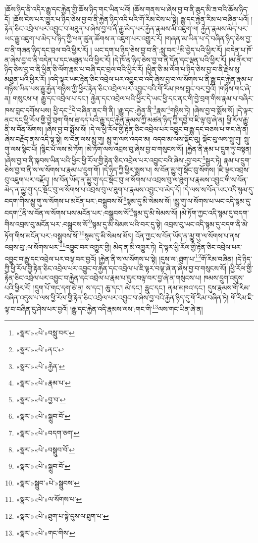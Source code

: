 །ཆོས་ཉིད་ནི་འདིར་རྒྱུ་དང་རྐྱེན་གྱི་ཆོས་ཉིད་གང་ཡིན་པའོ། །ཆོས་གནས་པ་ཞེས་བྱ་བ་ནི་ཆུད་མི་ཟ་བའི་ཆོས་ཉིད་དོ། །ཆོས་ངེས་པར་གྱུར་པ་ཉིད་ཅེས་བྱ་བ་ནི་རྐྱེན་ཉིད་འདི་པའི་གོ་རིམ་ངེས་པ་སྟེ། རྒྱུ་དང་རྐྱེན་རིམ་པ་བཞིན་པའོ། །རྟེན་ཅིང་འབྲེལ་པར་འབྱུང་བ་མཐུན་པ་ཞེས་བྱ་བ་ནི་རྒྱུ་མེད་པར་རྐྱེན་རྣམས་མི་འཇུག་ལ། རྐྱེན་རྣམས་མེད་པར་ཡང་རྒྱུ་འཇུག་པ་མེད་པ་ཉིད་ཀྱི་ཕན་ཚུན་ཚོགས་ན་འཇུག་པར་འགྱུར་རོ། །གཞན་མ་ཡིན་པ་དེ་བཞིན་ཉིད་ཅེས་བྱ་བ་ནི་གཞན་ཉིད་དང་བྲལ་བའི་ཕྱིར་རོ། །
ཡང་དག་པ་ཉིད་ཅེས་བྱ་བ་ནི་:སླུ་བར་\footnote{«སྣར་»«པེ་»བསླུ་བར་}མི་བྱེད་པའི་ཕྱིར་རོ། །བདེན་པ་ཁོ་ན་ཞེས་བྱ་བ་ནི་བདེན་པ་དང་མཐུན་པའི་ཕྱིར་རོ། །དེ་ཁོ་ན་ཉིད་ཅེས་བྱ་བ་ནི་དོན་དང་ལྡན་པའི་ཕྱིར་རོ། །མ་ནོར་བ་ཉིད་ཅེས་བྱ་བ་ནི་ཕྱིན་ཅི་ལོག་རྣམ་པ་བཞི་དང་བྲལ་བའི་ཕྱིར་རོ། །ཕྱིན་ཅི་མ་ལོག་པ་ཉིད་ཅེས་བྱ་བ་ནི་རྗེས་སུ་མཐུན་པའི་ཕྱིར་རོ། །འདི་ལྟར་ཡང་རྟེན་ཅིང་འབྲེལ་པར་འབྱུང་བ་འདི་ཞེས་བྱ་བ་ལ་སོགས་པ་ནི་རྒྱུ་དང་རྐྱེན་རྣམ་པ་གཉིས་ཡིན་པས་རྒྱུ་རྐྱེན་གཉིས་ཀྱི་ཕྱིར་རྟེན་ཅིང་འབྲེལ་པར་འབྱུང་བའི་གོ་རིམ་ཁས་བླང་བར་བྱའོ། །གཉིས་གང་ཞེ་ན། གསུངས་པ། རྒྱུ་དང་འབྲེལ་པ་དང་། རྐྱེན་དང་འབྲེལ་པའི་ཕྱིར་དེ་ཡང་ཕྱི་དང་ནང་གི་བྱེ་བྲག་གིས་རྣམ་པ་བཞིར་ཁས་བླང་དགོས་པས། ཕྱི་དང་\footnote{«སྣར་»«པེ་»ནང་}དེ་བཞིན་ནང་གི་ནི། །རྒྱུ་དང་:རྐྱེན་ནི་\footnote{«སྣར་»«པེ་»རྐྱེན་}རྣམ་\footnote{«སྣར་»«པེ་»རྣམ་པ་}གཉིས་ཏེ། །ཞེས་བྱ་བ་སྨོས་སོ། །དེ་ལྟར་ནང་དང་ཕྱི་རོལ་གྱི་བྱེ་བྲག་གིས་ཐ་དད་པའི་རྒྱུ་དང་རྐྱེན་རྣམས་ཀྱི་མཚན་ཉིད་ཀྱི་དབྱེ་བ་ཇི་ལྟ་བུ་ཞེ་ན། ཕྱི་རོལ་རྒྱུ་ནི་ས་བོན་སོགས། །ཞེས་བྱ་བ་སྨོས་སོ། །དེ་ལ་ཕྱི་རོལ་གྱི་རྟེན་ཅིང་འབྲེལ་པར་འབྱུང་བ་རྒྱུ་དང་བཅས་པ་གང་ཞེ་ན། ཞེས་བརྗོད་ནས་འདི་ལྟ་སྟེ། ས་བོན་ལས་མྱུ་གུ། མྱུ་གུ་ལས་འདབ་མ། འདབ་མ་ལས་སྡོང་བུ། སྡོང་བུ་ལས་སྦུ་གུ། སྦུ་གུ་ལས་སྙིང་པོ། །སྙིང་པོ་ལས་མེ་ཏོག །མེ་ཏོག་ལས་འབྲས་བུ་ཞེས་བྱ་བ་གསུངས་སོ། །རྐྱེན་ནི་རྣམ་པ་དྲུག་ཏུ་བསྟན། །ཞེས་བྱ་བ་ནི་སྐབས་ཡིན་པའི་ཕྱིར་ཕྱི་རོལ་གྱི་རྟེན་ཅིང་འབྲེལ་པར་འབྱུང་བའི་ཞེས་:བྱ་བར་\footnote{«སྣར་»«པེ་»བྱ་བ་}སྦྱར་ཏེ། རྣམ་པ་དྲུག་ཅེས་བྱ་བ་ནི་ས་ལ་སོགས་པ་རྣམ་པ་དྲུག་གོ། །དེ་ཉིད་ཀྱི་ཕྱིར་སྨྲས་པ། ས་བོན་མྱུ་གུ་སྡོང་བུ་སོགས། །ཇི་ལྟར་འབྲས་བུ་འཇུག་པར་བརྗོད། །ས་བོན་ཡོད་ན་མྱུ་གུ་དང་སྡོང་བུ་ལ་སོགས་པ་འབྲས་བུ་ལ་ཐུག་པ་རྣམས་འབྱུང་གི་ས་བོན་མེད་ན་མྱུ་གུ་དང་སྡོང་བུ་ལ་སོགས་པ་འབྲས་བུ་ལ་ཐུག་པ་རྣམས་འབྱུང་བ་མེད་དོ། །དེ་ལས་ས་བོན་ཡང་འདི་སྙམ་དུ་བདག་གིས་མྱུ་གུ་ལ་སོགས་པ་མངོན་པར་:བསྒྲུབས་སོ་\footnote{«སྣར་»«པེ་»སྒྲུབ་བོ་}སྙམ་དུ་མི་སེམས་སོ། །མྱུ་གུ་ལ་སོགས་པ་ཡང་འདི་སྙམ་དུ་བདག་\footnote{«སྣར་»«པེ་»བདག་ཅག་}ནི་ས་བོན་ལ་སོགས་པས་མངོན་པར་:བསྒྲུབས་སོ་\footnote{«སྣར་»«པེ་»བསྒྲུབ་བོ་}སྙམ་དུ་མི་སེམས་སོ། །མེ་ཏོག་ཀྱང་འདི་སྙམ་དུ་བདག་གིས་འབྲས་བུ་མངོན་པར་:བསྒྲུབས་སོ་\footnote{«སྣར་»«པེ་»སྒྲུབ་བོ་}སྙམ་དུ་མི་སེམས་པའི་བར་དུ་སྟེ། འབྲས་བུ་ཡང་འདི་སྙམ་དུ་བདག་ནི་མེ་ཏོག་གིས་མངོན་པར་:བསྒྲུབས་སོ་\footnote{«སྣར་»སྒྲུབ་«པེ་»སྒྲུབས་}སྙམ་དུ་མི་སེམས་མོད། འོན་ཀྱང་ས་བོན་ཡོད་ན་མྱུ་གུ་ལ་སོགས་པ་ནས་འབྲས་བུ་:ལ་སོགས་པར་\footnote{«སྣར་»«པེ་»ལ་སོགས་པ་}འབྱུང་བར་འགྱུར་གྱི། མེད་ན་མི་འགྱུར་ཏེ། དེ་ལྟར་ཕྱི་རོལ་གྱི་རྟེན་ཅིང་འབྲེལ་པར་འབྱུང་བ་རྒྱུ་དང་འབྲེལ་པར་བལྟ་བར་བྱའོ། །རྐྱེན་ནི་ས་ལ་སོགས་པ་སྟེ། །དུས་ལ་:ཐུག་པ་\footnote{«སྣར་»«པེ་»ཐུག་པ་སྟེ་དུས་ལ་ཐུག་པ་}གོ་རིམ་བཞིན། །དེ་ཉིད་ཀྱི་ཕྱི་རོལ་གྱི་རྟེན་ཅིང་འབྲེལ་པར་འབྱུང་བ་རྐྱེན་དང་འབྲེལ་པ་ཇི་ལྟར་བལྟ་ཞེ་ན་ཞེས་བྱ་བ་གསུངས་སོ། །ཕྱི་རོལ་གྱི་རྟེན་ཅིང་འབྲེལ་པར་འབྱུང་བ་རྐྱེན་དང་འབྲེལ་པ་རྣམ་པ་དུར་བལྟ་བར་བྱ་ཞེ་ན་གསུངས་པ། ཁམས་དྲུག་འདུས་པའི་ཕྱིར་རོ། །དྲུག་པོ་གང་དག་ཅེ་ན། ས་དང་། ཆུ་དང་། མེ་དང་། རླུང་དང་། ནམ་མཁའ་དང་། དུས་རྣམས་གོ་རིམ་བཞིན་འདུས་པ་ལས་ཕྱི་རོལ་གྱི་རྟེན་ཅིང་འབྲེལ་པར་འབྱུང་བ་ཞེས་བྱ་བའི་རྐྱེན་ཉིད་དུ་གོ་རིམ་བཞིན་ཏེ། གོ་རིམ་ཇི་ལྟ་བ་བཞིན་དུ་ཤེས་པར་བྱའོ། །རྒྱུ་དང་རྐྱེན་འདི་རྣམས་ལས་:གང་གི་\footnote{«སྣར་»«པེ་»གང་གིས་}ལས་གང་ཡིན་ཞེ་ན། 